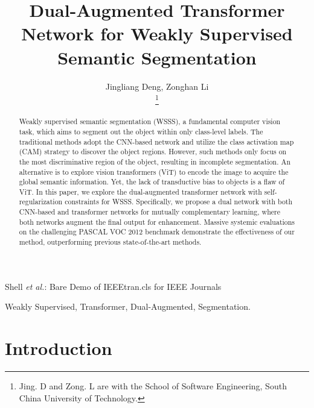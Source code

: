 \documentclass[journal]{IEEEtran}
\begin{document}
\title{Dual-Augmented Transformer Network for Weakly Supervised Semantic Segmentation}

\author{Jingliang Deng, Zonghan Li


\thanks{Jing. D and Zong. L are with the School of Software Engineering, South China University of Technology.}
}

{Shell \MakeLowercase{\textit{et al.}}: Bare Demo of IEEEtran.cls for IEEE Journals}
\maketitle

\begin{abstract}
Weakly supervised semantic segmentation (WSSS), a fundamental computer vision task, which aims to segment out the object within only class-level labels. The traditional methods adopt the CNN-based network and utilize the class activation map (CAM) strategy to discover the object regions. However, such methods only focus on the most discriminative region of the object, resulting in incomplete segmentation. An alternative is to explore vision transformers (ViT) to encode the image to acquire the global semantic information. Yet, the lack of transductive bias to objects is a flaw of ViT. In this paper, we explore the dual-augmented transformer network with self-regularization constraints for WSSS. Specifically, we propose a dual network with both CNN-based and transformer networks for mutually complementary learning, where both networks augment the final output for enhancement. Massive systemic evaluations on the challenging PASCAL VOC 2012 benchmark demonstrate the effectiveness of our method, outperforming previous state-of-the-art methods.

\end{abstract}

\begin{IEEEkeywords}
Weakly Supervised, Transformer, Dual-Augmented, Segmentation.
\end{IEEEkeywords}


\IEEEpeerreviewmaketitle



\section{Introduction}
\end{document}
